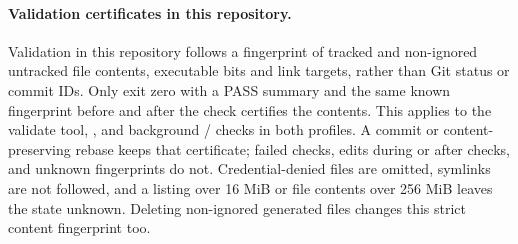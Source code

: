 \paragraph{Validation certificates in this repository.}
Validation in this repository follows a fingerprint of tracked and non-ignored
untracked file contents, executable bits and link targets, rather than Git
status or commit IDs. Only exit zero with a PASS summary and the same known
fingerprint before and after the check certifies the contents. This applies to
the validate tool, , and background / checks in
both profiles. A commit or content-preserving rebase keeps that certificate;
failed checks, edits during or after checks, and unknown fingerprints do not.
Credential-denied files are omitted, symlinks are not followed, and a listing
over 16 MiB or file contents over 256 MiB leaves the state unknown. Deleting
non-ignored generated files changes this strict content fingerprint too.
